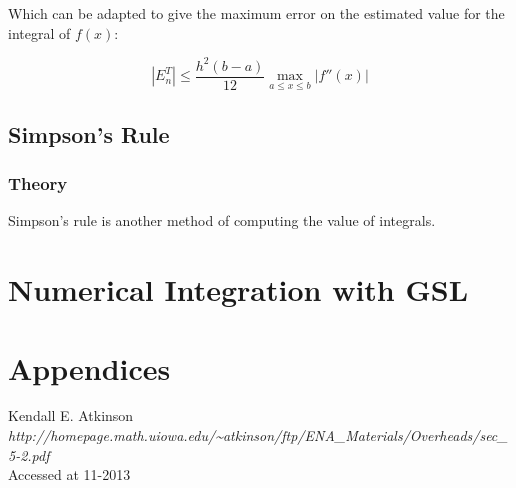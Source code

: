 \documentclass[pdf,color]{UoBnote}
\begin{document}
			Which can be adapted to give the maximum error on the estimated value for the integral of $f(x)$:
			
			\begin{equation} \label{eq:trap_err2}
				\left|E_n^T\right| \leq \frac{h^2\left(b-a\right)}{12}\max_{a \leq x \leq b}\left|f''(x)\right|
			\end{equation}
			
		\subsection{Simpson's Rule}
			\subsubsection{Theory}
				Simpson's rule is another method of computing the value of integrals. 

\section{Numerical Integration with GSL}

\section{Appendices}

\begin{thebibliography}{breitestes Label}
	 Kendall E. Atkinson\\{\em http://homepage.math.uiowa.edu/\textasciitilde{}atkinson/ftp/ENA\_Materials/Overheads/sec\_5-2.pdf}\\Accessed at 11-2013
\end{thebibliography}
\end{document}
